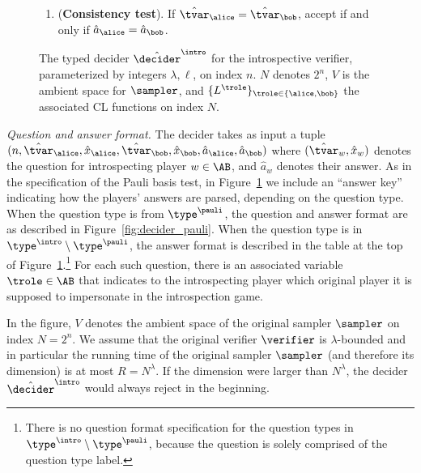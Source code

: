 \begin{figure}[!htbp]
\begin{gamespec}
\begin{enumerate}[itemsep=2pt, parsep=2pt]
    \item (\textbf{Consistency test}).
      \label{enu:intro-consistency}
      If $\hat{\tvar}_\alice = \hat{\tvar}_\bob$, accept if and only if
      $\hat{a}_\alice = \hat{a}_\bob$.
    \end{enumerate}
  \end{gamespec}
  \caption{The typed decider $\tdint$ for the introspective verifier,
    parameterized by integers $\lambda, \ell$, on index $n$.
    $N$ denotes $2^n$, $V$ is the ambient space for $\sampler$, and
    $\{L^\trole\}_{\trole\in\{\alice,\bob\}}$ the associated CL functions on
    index $N$.}
  \label{fig:intro-decider}
\end{figure}

\medskip
\emph{Question and answer format.}
The decider takes as input a tuple $(n, \hat{\tvar}_\alice, \hat{x}_\alice,
\hat{\tvar}_\bob, \hat{x}_\bob, \hat{a}_\alice, \hat{a}_\bob)$ where
$(\hat{\tvar}_w,\hat{x}_w)$ denotes the question for introspecting player $w \in
\AB$, and $\hat{a}_w$ denotes their answer.
As in the specification of the Pauli basis test, in
Figure~\ref{fig:intro-decider} we include an ``answer key'' indicating how the
players' answers are parsed, depending on the question type.
When the question type is from $\type^\pauli$, the question and answer format
are as described in Figure~\ref{fig:decider_pauli}.
When the question type is in $\type^\intro \setminus \type^\pauli$, the answer
format is described in the table at the top of
Figure~\ref{fig:intro-decider}.\footnote{There is no question format
  specification for the question types in $\type^\intro \setminus \type^\pauli$,
  because the question is solely comprised of the question type label.}
For each such question, there is an associated variable $\trole \in \AB$ that
indicates to the introspecting player which {original player} it is supposed to
impersonate in the introspection game.

In the figure, $V$ denotes the ambient space of the original sampler $\sampler$
on index $N = 2^n$.  We assume that the original verifier $\verifier$ is $\lambda$-bounded and in particular the running time of the original sampler $\sampler$ (and therefore its dimension) is at most $R = N^\lambda$. If the dimension were larger than $N^\lambda$, the decider $\hat{\decider}^\intro$ would always reject in the beginning. 

